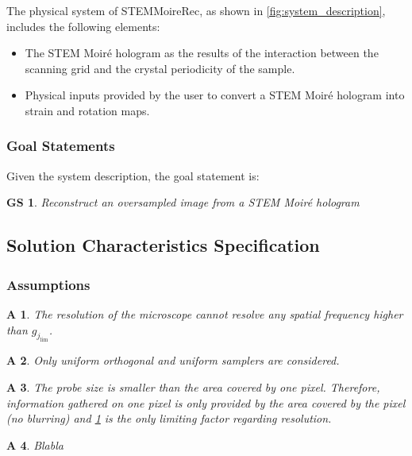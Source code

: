 \documentclass[12pt]{article}
\newcommand{\progname}{STEMMoireRec}
\newtheorem{GS}{GS}
\newtheorem{A}{A}
\begin{document}
The physical system of \progname{}, as shown in \cref{fig:system_description}, 
includes the following elements:
\begin{itemize}
\item The STEM Moir{\'e} hologram as the results of the interaction between the 
scanning grid and the crystal periodicity of the sample.
\item Physical inputs provided by the user to convert a STEM Moir{\'e} hologram 
into strain and rotation maps.
\end{itemize}


\subsubsection{Goal Statements}
\noindent Given the system description, the goal statement is:
\begin{GS}
\normalfont Reconstruct an oversampled image from a STEM Moir{\'e} hologram
\label{GS_1}
\end{GS}

\subsection{Solution Characteristics Specification}

\subsubsection{Assumptions}

\begin{A}
\normalfont The resolution of the microscope cannot resolve any spatial frequency higher than 
$g_{j_{\text{lim}}}$. 
\label{A_1}
\end{A}
\begin{A}
\normalfont Only uniform orthogonal and uniform samplers are considered.
\label{A_2}
\end{A}
\begin{A}
\normalfont The probe size is smaller than the area covered by one pixel. 
Therefore, information gathered on one pixel is only provided by the area 
covered by the pixel (no blurring) and \cref{A_1} is the only limiting factor 
regarding resolution.
\label{A_3}
\end{A}
\begin{A}
\label{A_4}
\normalfont Blabla
\end{A}
\end{document}
